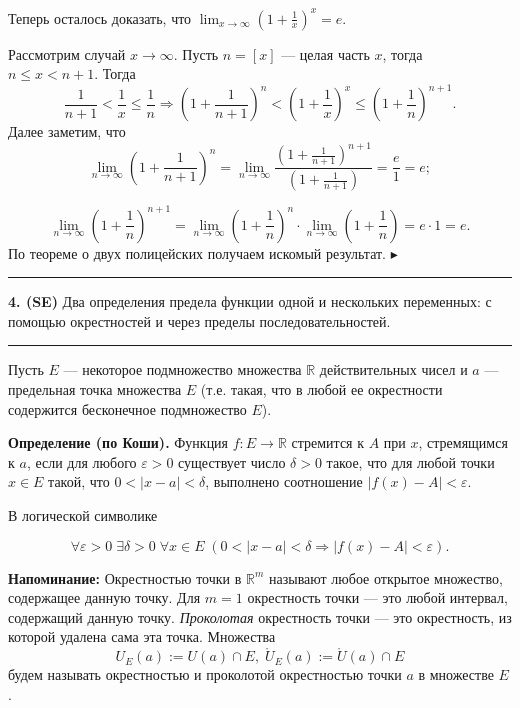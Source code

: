 \documentclass[12pt]{article}
\begin{document}
Теперь осталось доказать, что $\lim_{x \rightarrow \infty} \left( 1 + \frac{1}{x} \right)^x = e$.

Рассмотрим случай $x \rightarrow \infty$. Пусть $n = [x]$ --- целая часть $x$, тогда $n \leq x < n+1$. Тогда
$$
	\frac{1}{n+1} < \frac{1}{x} \leq \frac{1}{n} \Rightarrow 
	\left( 1+ \frac{1}{n+1} \right)^n < \left( 1 + \frac{1}{x}\right)^x \leq \left( 1 + \frac{1}{n} \right)^{n+1}.
$$
Далее заметим, что
$$
\lim_{n \rightarrow \infty} \left( 1+ \frac{1}{n+1} \right)^n = 
\lim_{n\rightarrow \infty} \frac{\left( 1 + \frac{1}{n+1} \right)^{n+1}}{\left( 1 + \frac{1}{n+1} \right)} = \frac{e}{1} = e;
$$

$$
\lim_{n \rightarrow \infty} \left( 1 + \frac{1}{n} \right)^{n+1} = 
\lim_{n \rightarrow \infty} \left( 1 + \frac{1}{n} \right)^{n} \cdot 
\lim_{n \rightarrow \infty} \left( 1 + \frac{1}{n} \right) = e \cdot 1 = e.
$$
По теореме о двух полицейских получаем искомый результат.
$\blacktriangleright$ \\

\noindent\rule{\textwidth}{1pt}
\textbf{4. (SE)} Два определения предела функции одной и нескольких переменных: с помощью окрестностей и через пределы последовательностей.
\noindent\rule{\textwidth}{1pt}


Пусть $E$ --- некоторое подмножество множества $\mathbb{R}$ действительных чисел и $a$ --- предельная точка множества $E$ (т.е. такая, что в любой ее окрестности содержится бесконечное подмножество $E$). 

\textbf{Определение (по Коши).} Функция $f : E \rightarrow \mathbb{R}$ стремится к $A$ при $x$, стремящимся к $a$, если для любого $\varepsilon > 0$ существует число $\delta > 0$ такое, что 	для любой точки $x \in E$ такой, что $0< |x - a| < \delta$, выполнено соотношение $|f(x) - A| < \varepsilon$. 

В логической символике

$$
\forall \varepsilon > 0 \; \exists \delta > 0 \; \forall x \in E \; (0 < |x -a| < \delta \Rightarrow |f(x) - A| < \varepsilon).  
$$

\textbf{Напоминание:} Окрестностью точки в  $\mathbb{R}^m$ называют любое открытое множество, содержащее данную точку. Для $m=1$ окрестность точки --- это любой интервал, содержащий данную точку. \textit{Проколотая} окрестность точки --- это окрестность, из которой удалена сама эта точка. Множества 
$$
	U_E(a) := U(a) \cap E, \; \mathring{U}_E(a) := \mathring{U}(a) \cap E
$$
будем называть окрестностью и проколотой окрестностью точки $a$ в множестве $E$.
\end{document}
